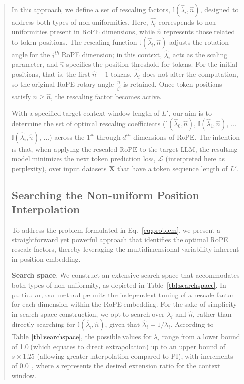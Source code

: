 \begin{abstract}
In this approach, we define a set of rescaling factors, $\mathbb{I}(\hat{\lambda}_{i},\hat{n})$, designed to address both types of non-uniformities. Here, $\hat{\lambda_i}$ corresponds to non-uniformities present in RoPE dimensions, while $\hat{n}$ represents those related to token positions. The rescaling function $\mathbb{I}(\hat{\lambda}_{i},\hat{n})$ adjusts the rotation angle for the $i^{th}$ RoPE dimension; in this context, $\hat{\lambda}_{i}$ acts as the scaling parameter, and $\hat{n}$ specifies the position threshold for tokens. For the initial positions, that is, the first $\hat{n} - 1$ tokens, $\hat{\lambda}_{i}$ does not alter the computation, so the original RoPE rotary angle $\frac{n}{\beta^i}$ is retained. Once token positions satisfy $n \ge \hat{n}$, the rescaling factor becomes active.

With a specified target context window length of $L'$, our aim is to determine the set of optimal rescaling coefficients ($\mathbb{I}(\hat{\lambda}_{0},\hat{n})$, $\mathbb{I}(\hat{\lambda}_{1},\hat{n})$, ...$\mathbb{I}(\hat{\lambda}_{i},\hat{n})$, ...) across the $1^{st}$ through $d^{th}$ dimensions of RoPE. The intention is that, when applying the rescaled $\text{RoPE}$ to the target $\text{LLM}$, the resulting model minimizes the next token prediction loss, $\mathcal{L}$ (interpreted here as perplexity), over input datasets $\mathbf{X}$ that have a token sequence length of $L'$.

\subsection{Searching the Non-uniform Position Interpolation}

To address the problem formulated in Eq.~\ref{eq:problem}, we present a straightforward yet powerful approach that identifies the optimal RoPE rescale factors, thereby leveraging the multidimensional variability inherent in position embedding.

\textbf{Search space}. We construct an extensive search space that accommodates both types of non-uniformity, as depicted in Table~\ref{tbl:searchspace}. In particular, our method permits the independent tuning of a rescale factor for each dimension within the RoPE embedding. For the sake of simplicity in search space construction, we opt to search over $\lambda_i$ and $\hat{n}$, rather than directly searching for $\mathbb{I}(\hat{\lambda}_{i},\hat{n})$, given that $\hat{\lambda}_{i}=1/\lambda_i$. According to Table~\ref{tbl:searchspace}, the possible values for $\lambda_i$ range from a lower bound of 1.0 (which equates to direct extrapolation) up to an upper bound of $s\times1.25$ (allowing greater interpolation compared to PI), with increments of 0.01, where $s$ represents the desired extension ratio for the context window.


\end{abstract}
